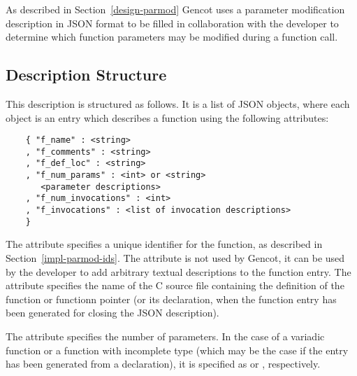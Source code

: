 As described in Section~\ref{design-parmod} Gencot uses a parameter modification description in JSON format 
to be filled in collaboration with the developer to determine which function parameters may be modified during
a function call. 

\subsection{Description Structure}
\label{impl-parmod-struct}

This
description is structured as follows. It is a list of JSON objects, where each object is an entry which describes a function using
the following attributes:
\begin{verbatim}
    { "f_name" : <string>
    , "f_comments" : <string>
    , "f_def_loc" : <string>
    , "f_num_params" : <int> or <string>
       <parameter descriptions>
    , "f_num_invocations" : <int>
    , "f_invocations" : <list of invocation descriptions>
    }
\end{verbatim}

The attribute  specifies a unique identifier for the function, as described in Section~\ref{impl-parmod-ids}.
The attribute  is not used by Gencot, it can be used by the developer to add arbitrary textual
descriptions to the function entry. The attribute  specifies the name of the C source file containing
the definition of the function or functionn pointer (or its declaration, when the function entry has been 
generated for closing the JSON description). 

The attribute  specifies the number of parameters. In the case of a variadic function or a function
with incomplete type (which may be the case if the entry has been generated from a declaration), it is specified
as  or , respectively.

